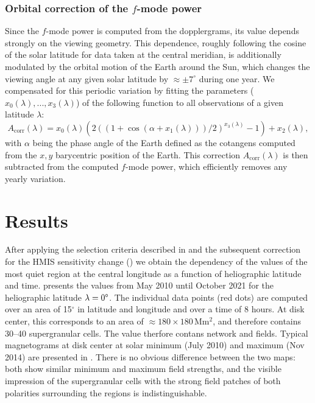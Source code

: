 \documentclass{aa}
\begin{document}
\subsubsection*{Orbital correction of the $f$-mode power}

Since the $f$-mode power is computed from the \los{} dopplergrams, its value depends strongly on the viewing geometry. This dependence,  roughly following the cosine of the solar latitude for data taken at the central meridian, is additionally modulated by the orbital motion of the Earth around the Sun, which changes the viewing angle at any given solar latitude by $\approx\pm7^\circ$ during one year. We compensated for this periodic variation by fitting the parameters ($x_0(\lambda), ..., x_3(\lambda)$) of the following function to all observations of a given latitude $\lambda$:
\begin{equation}
\label{eq:orbitcorr}
A_{\mbox{corr}}(\lambda) = x_0(\lambda) (  2 ( (1+\cos(\alpha+x_1(\lambda)))/2)^{x_3(\lambda)}-1   )+ x_2(\lambda),
\end{equation}
with $\alpha$ being the phase angle of the Earth defined as the cotangens computed from the $x,y$ barycentric position of the Earth.
This correction $A_{\mbox{corr}}(\lambda)$ is then subtracted from the computed $f$-mode power, which efficiently removes any yearly variation. 




\section{Results}\label{results}

After applying the selection criteria described in  and the subsequent correction for the HMIS sensitivity change () we obtain the dependency of the \brms{} values of the most quiet region at the central longitude as a function of heliographic latitude and time.  presents the \brms{} values from May 2010 until October 2021 for the heliographic latitude $\lambda = 0\degree$. The individual data points (red dots) are computed over an area of 15$^\circ$ in latitude and longitude and over a time of 8 hours. At disk center, this corresponds to an area of $\approx 180 \times 180$\,Mm$^2$, and therefore contains 30--40 supergranular cells. The \brms{} value therfore contans network and \IN{} fields.
Typical magnetograms at disk center at solar minimum (July 2010) and maximum (Nov 2014) are presented in . There is no obvious difference between the two maps: both show similar minimum and maximum field strengths, and the visible impression of the supergranular cells with the strong field patches of both polarities surrounding the \IN{} regions is indistinguishable.
\end{document}
